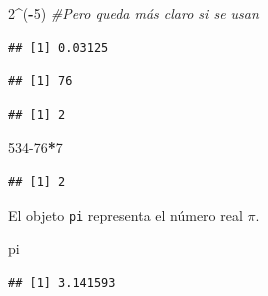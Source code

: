 \documentclass[]{book}
\newenvironment{Shaded}{\begin{snugshade}}{\end{snugshade}}
\newcommand{\CommentTok}[1]{\textcolor[rgb]{0.56,0.35,0.01}{\textit{#1}}}
\newcommand{\DecValTok}[1]{\textcolor[rgb]{0.00,0.00,0.81}{#1}}
\newcommand{\NormalTok}[1]{#1}
\newcommand{\OperatorTok}[1]{\textcolor[rgb]{0.81,0.36,0.00}{\textbf{#1}}}
\theoremstyle{definition}
\theoremstyle{definition}
\theoremstyle{definition}
\theoremstyle{remark}
\begin{document}
\begin{Shaded}
\begin{Highlighting}[]
\DecValTok{2}\OperatorTok{^}\NormalTok{(}\OperatorTok{-}\DecValTok{5}\NormalTok{) }\CommentTok{#Pero queda más claro si se usan}
\end{Highlighting}
\end{Shaded}

\begin{verbatim}
## [1] 0.03125
\end{verbatim}

\begin{Shaded}
\end{Shaded}

\begin{verbatim}
## [1] 76
\end{verbatim}

\begin{Shaded}
\end{Shaded}

\begin{verbatim}
## [1] 2
\end{verbatim}

\begin{Shaded}
\begin{Highlighting}[]
\DecValTok{534-76}\OperatorTok{*}\DecValTok{7}
\end{Highlighting}
\end{Shaded}

\begin{verbatim}
## [1] 2
\end{verbatim}

El objeto \texttt{pi} representa el número real \(\pi\).

\begin{Shaded}
\begin{Highlighting}[]
\NormalTok{pi}
\end{Highlighting}
\end{Shaded}

\begin{verbatim}
## [1] 3.141593
\end{verbatim}
\end{document}
